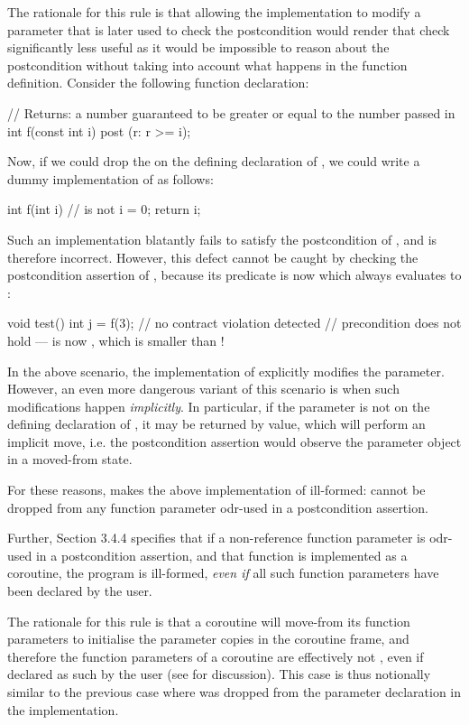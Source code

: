 The rationale for this rule is that allowing the implementation to modify a parameter that is later used to check the postcondition would render that check significantly less useful as it would be impossible to reason about the postcondition without taking into account what happens in the function definition. Consider the following function declaration:
\begin{codeblock}
// Returns: a number guaranteed to be greater or equal to the number passed in
int f(const int i) post (r: r >= i);
\end{codeblock}
Now, if we could drop the  on the defining declaration of , we could write a dummy implementation of  as follows:
\begin{codeblock}
int f(int i) {  //  is not 
  i = 0;
  return i;
}
\end{codeblock}
Such an implementation blatantly fails to satisfy the postcondition of , and is therefore incorrect. However, this defect cannot be caught by checking the postcondition assertion of , because its predicate is now  which always evaluates to :
\begin{codeblock}
void test() {
  int j = f(3); // no contract violation detected
  // precondition does not hold ---  is now , which is smaller than !
}
\end{codeblock}
In the above scenario, the implementation of  explicitly modifies the parameter. However, an even more dangerous variant of this scenario is when such modifications happen \emph{implicitly}. In particular, if the parameter is not  on the defining declaration of , it may be returned by value, which will perform an implicit move, i.e. the postcondition assertion would observe the parameter object in a moved-from state.

For these reasons, \cite{P2900R10} makes the above implementation of  ill-formed:  cannot be dropped from any function parameter odr-used in a postcondition assertion.

Further, \cite{P2900R10} Section 3.4.4 specifies that if a non-reference function parameter is odr-used in a postcondition assertion, and that function is implemented as a coroutine, the program is ill-formed, \emph{even if} all such function parameters have been declared  by the user.

The rationale for this rule is that a coroutine will move-from its function parameters to initialise the parameter copies in the coroutine frame, and therefore the function parameters of a coroutine are effectively not , even if declared as such by the user (see \cite{P3387R0} for discussion). This case is thus notionally similar to the previous case where  was dropped from the parameter declaration in the implementation.

